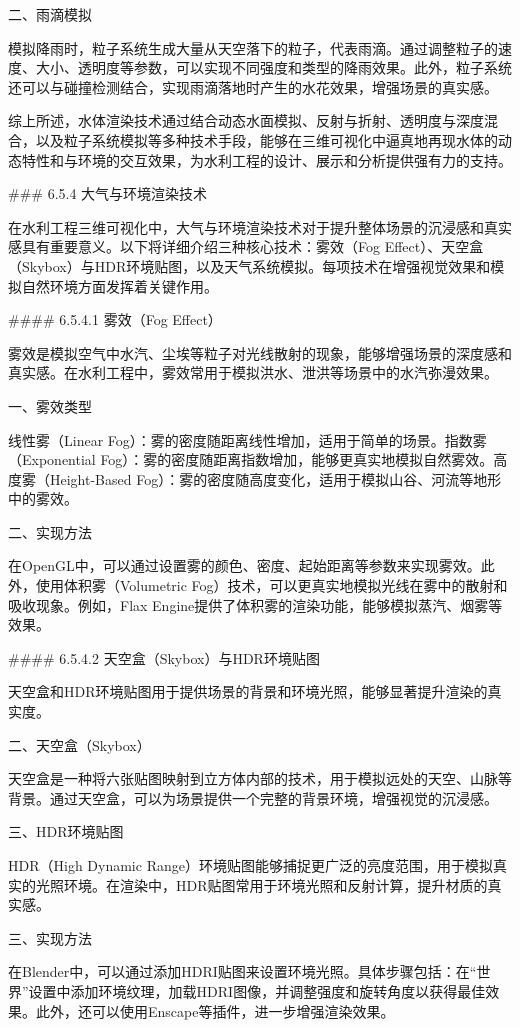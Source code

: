 二、雨滴模拟

模拟降雨时，粒子系统生成大量从天空落下的粒子，代表雨滴。通过调整粒子的速度、大小、透明度等参数，可以实现不同强度和类型的降雨效果。此外，粒子系统还可以与碰撞检测结合，实现雨滴落地时产生的水花效果，增强场景的真实感。

综上所述，水体渲染技术通过结合动态水面模拟、反射与折射、透明度与深度混合，以及粒子系统模拟等多种技术手段，能够在三维可视化中逼真地再现水体的动态特性和与环境的交互效果，为水利工程的设计、展示和分析提供强有力的支持。

\#\#\# 6.5.4 大气与环境渲染技术

在水利工程三维可视化中，大气与环境渲染技术对于提升整体场景的沉浸感和真实感具有重要意义。以下将详细介绍三种核心技术：雾效（Fog Effect）、天空盒（Skybox）与HDR环境贴图，以及天气系统模拟。每项技术在增强视觉效果和模拟自然环境方面发挥着关键作用。

\#\#\#\# 6.5.4.1 雾效（Fog Effect）

雾效是模拟空气中水汽、尘埃等粒子对光线散射的现象，能够增强场景的深度感和真实感。在水利工程中，雾效常用于模拟洪水、泄洪等场景中的水汽弥漫效果。

一、雾效类型

线性雾（Linear Fog）：雾的密度随距离线性增加，适用于简单的场景。指数雾（Exponential Fog）：雾的密度随距离指数增加，能够更真实地模拟自然雾效。高度雾（Height-Based Fog）：雾的密度随高度变化，适用于模拟山谷、河流等地形中的雾效。

二、实现方法

在OpenGL中，可以通过设置雾的颜色、密度、起始距离等参数来实现雾效。此外，使用体积雾（Volumetric Fog）技术，可以更真实地模拟光线在雾中的散射和吸收现象。例如，Flax Engine提供了体积雾的渲染功能，能够模拟蒸汽、烟雾等效果。

\#\#\#\# 6.5.4.2 天空盒（Skybox）与HDR环境贴图

天空盒和HDR环境贴图用于提供场景的背景和环境光照，能够显著提升渲染的真实度。

二、天空盒（Skybox）

天空盒是一种将六张贴图映射到立方体内部的技术，用于模拟远处的天空、山脉等背景。通过天空盒，可以为场景提供一个完整的背景环境，增强视觉的沉浸感。

三、HDR环境贴图

HDR（High Dynamic Range）环境贴图能够捕捉更广泛的亮度范围，用于模拟真实的光照环境。在渲染中，HDR贴图常用于环境光照和反射计算，提升材质的真实感。

三、实现方法

在Blender中，可以通过添加HDRI贴图来设置环境光照。具体步骤包括：在``世界''设置中添加环境纹理，加载HDRI图像，并调整强度和旋转角度以获得最佳效果。此外，还可以使用Enscape等插件，进一步增强渲染效果。

